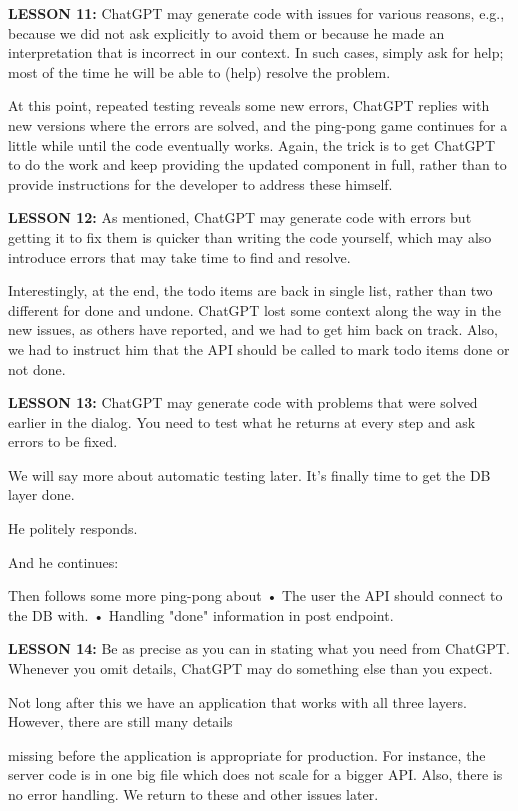 \documentclass[runningheads]{llncs}
\begin{document}
\textbf{LESSON 11:} ChatGPT may generate code with issues for various reasons, e.g., because we did not ask explicitly to avoid them or because he made an interpretation that is incorrect in our context. In such cases, simply ask for help; most of the time he will be able to (help) resolve the problem.

At this point, repeated testing reveals some new errors, ChatGPT replies with new versions where the errors are solved, and the ping-pong game continues for a little while until the code eventually works. Again, the trick is to get ChatGPT to do the work and keep providing the updated component in full, rather than to provide instructions for the developer to address these himself.

\textbf{LESSON 12:} As mentioned, ChatGPT may generate code with errors but getting it to fix them is quicker than writing the code yourself, which may also introduce errors that may take time to find and resolve.

Interestingly, at the end, the todo items are back in single list, rather than two different for done and undone. ChatGPT lost some context along the way in the new issues, as others have reported, and we had to get him back on track. Also, we had to instruct him that the API should be called to mark todo items done or not done.

\textbf{LESSON 13:} ChatGPT may generate code with problems that were solved earlier in the dialog. You need to test what he returns at every step and ask errors to be fixed.

We will say more about automatic testing later. It's finally time to get the DB layer done.

He politely responds.

And he continues:

Then follows some more ping-pong about
• The user the API should connect to the DB with.
• Handling "done" information in post endpoint.

\textbf{LESSON 14:} Be as precise as you can in stating what you need from ChatGPT. Whenever you omit details, ChatGPT may do something else than you expect.

Not long after this we have an application that works with all three layers. However, there are still many details

missing before the application is appropriate for production. For instance, the server code is in one big file which does not scale for a bigger API. Also, there is no error handling. We return to these and other issues later.
\end{document}
